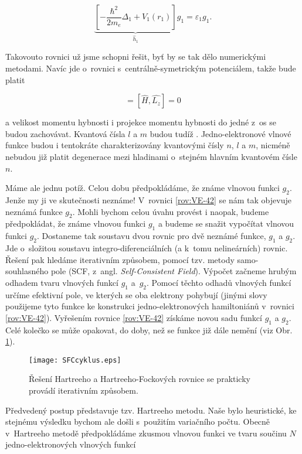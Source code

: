 \begin{equation}
\underbrace{\left[ - \frac{\hbar^2}{2 m_e} \Delta_1 + V_1(r_1) \right]}_{\hat{h}_1} g_1 = \varepsilon_1 g_1.
\label{rov:VE-42}
\end{equation}
 
Takovouto rovnici už jsme schopni řešit, byť by se tak dělo numerickými metodami. Navíc jde o~rovnici s~centrálně-symetrickým potenciálem, takže bude platit
 
\begin{equation}
[\hat{H},\hat{L}^2] = [\hat{H},\hat{L_z}] = 0
\label{rov:VE-43}
\end{equation}
 
\noindent a velikost momentu hybnosti i projekce momentu hybnosti do jedné z~os se budou zachovávat. Kvantová čísla $l$ a $m$ budou tudíž . Jedno-elektronové vlnové funkce budou i tentokráte charakterizovány kvantovými čísly $n$, $l$ a $m$, nicméně nebudou již platit degenerace mezi hladinami o~stejném hlavním kvantovém čísle $n$.
 
Máme ale jednu potíž. Celou dobu předpokládáme, že známe vlnovou funkci $g_2$. Jenže my ji ve skutečnosti neznáme! V~rovnici \eqref{rov:VE-42} se nám tak objevuje neznámá funkce $g_2$. Mohli bychom celou úvahu provést i naopak, budeme předpokládat, že známe vlnovou funkci $g_1$ a budeme se snažit vypočítat vlnovou funkci $g_2$. Dostaneme tak soustavu dvou rovnic pro dvě neznámé funkce, $g_1$ a $g_2$. Jde o~složitou soustavu integro-diferenciálních (a k~tomu nelineárních) rovnic. Řešení pak hledáme iterativním způsobem, pomocí tzv. metody samo-souhlasného pole (SCF, z~angl. \textit{Self-Consistent Field}). Výpočet začneme hrubým odhadem tvaru vlnových funkcí $g_1$ a~$g_2$. Pomocí těchto odhadů vlnových funkcí určíme efektivní pole, ve kterých se oba elektrony pohybují (jinými slovy použijeme tyto funkce ke konstrukci jedno-elektronových hamiltoniánů v~rovnici \eqref{rov:VE-42}). Vyřešením rovnice \eqref{rov:VE-42} získáme novou sadu funkcí $g_1$ a $g_2$. Celé kolečko se může opakovat, do doby, než se funkce již dále nemění (viz Obr. \ref{obr:SCFcycle}).

\begin{figure} [ht]
\centering
\texttt{[image: SFCcyklus.eps]}
\caption[SCF kolečko]{Řešení Hartreeho a Hartreeho-Fockových rovnice se prakticky provádí iterativním způsobem.}
\label{obr:SCFcycle}
\end{figure}
  
Předvedený postup představuje tzv. Hartreeho metodu. Naše  bylo heuristické, ke stejnému výsledku bychom ale došli s~použitím variačního počtu. Obecně v~Hartreeho metodě předpokládáme zkusmou vlnovou funkci ve tvaru součinu $N$ jedno-elektronových vlnových funkcí

